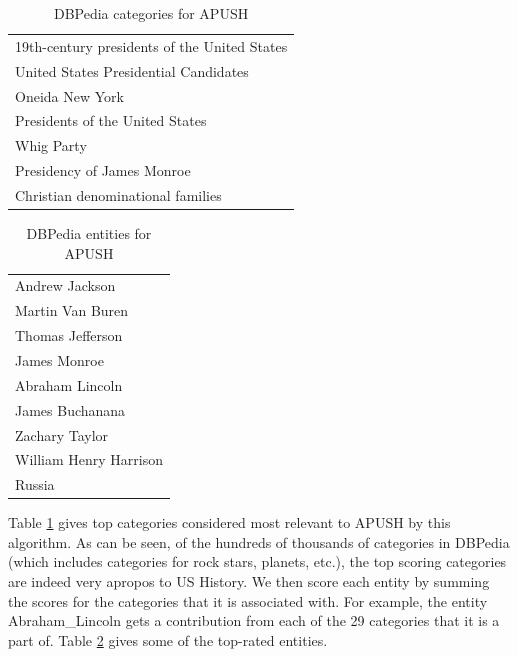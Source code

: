 \documentclass[pdfpagelabels=false,plainpages=true]{acm_proc_article-sp}
\begin{document}
\begin{table}
\begin{center}
\begin{tabular}{|l|} \hline
19th-century presidents of the United States \\
United States Presidential Candidates \\
Oneida New York \\
Presidents of the United States \\
Whig Party \\
Presidency of James Monroe \\
Christian denominational families \\
\hline \end{tabular}
\caption{DBPedia categories for APUSH}
\label{tab-categories}
\end{center}
\end{table}

\begin{table}
\begin{center}
\begin{tabular}{|l|} \hline
Andrew Jackson \\
Martin Van Buren \\
Thomas Jefferson \\
James Monroe \\
Abraham Lincoln \\
James Buchanana \\
Zachary Taylor \\
William Henry Harrison \\
Russia \\
\hline\end{tabular}
\caption{DBPedia entities for APUSH}
\label{tab-entities}
\end{center}
\end{table}

Table \ref{tab-categories} gives top categories considered most relevant to
APUSH by this algorithm. As can be seen, of the hundreds of thousands of
categories in DBPedia (which includes categories for rock stars, planets, etc.), the
top scoring categories are indeed very apropos to US History.           
We then score each entity by summing the scores for the categories that it is
associated with. For example, the entity Abraham\_Lincoln gets a contribution
from each of the 29 categories that it is a part of. Table \ref{tab-entities}
gives some of the top-rated entities. 
\end{document}
